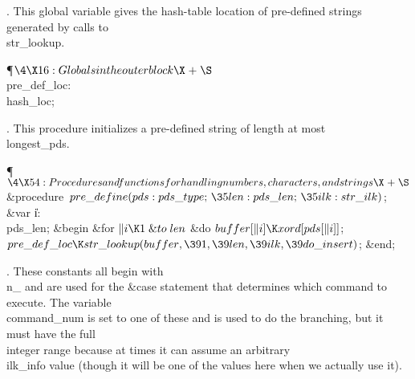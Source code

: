 .
This global variable gives the hash-table location of pre-defined
strings generated by calls to \\{str\_lookup}.

\Y\P$\4\X16:Globals in the outer block\X\mathrel{+}\S$\6
\4\\{pre\_def\_loc}: \\{hash\_loc};\par
\fi

.
This procedure initializes a pre-defined string of length at most
\\{longest\_pds}.

\Y\P$\4\X54:Procedures and functions for handling numbers, characters, and
strings\X\mathrel{+}\S$\6
\4\&{procedure}\1\  $\\{pre\_define}(\\{pds}:\\{pds\_type};\,\35\\{len}:%
\\{pds\_len};\,\35\\{ilk}:\\{str\_ilk})$;\6
\4\&{var} \|i: \\{pds\_len};\2\6
\&{begin} \&{for} $\|i\K1\mathrel{\&{to}}\\{len}$ \1\&{do}\5
$\\{buffer}[\|i]\K\\{xord}[\\{pds}[\|i]]$;\2\6
$\\{pre\_def\_loc}\K\\{str\_lookup}(\\{buffer},\391,\39\\{len},\39\\{ilk},\39%
\\{do\_insert})$;\6
\&{end};\par
\fi

.
These constants all begin with \\{n\_} and are used for the   \&{case}
statement that determines which command to execute.  The variable
\\{command\_num} is set to one of these and is used to do the branching,
but it must have the full \\{integer} range because at times it can
assume an arbitrary \\{ilk\_info} value (though it will be one of the
values here when we actually use it).

